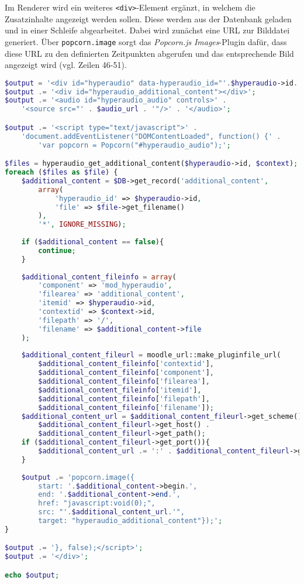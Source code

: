 Im Renderer wird ein weiteres \texttt{<div>}-Element ergänzt, in welchem die Zusatzinhalte angezeigt werden sollen. Diese werden aus der Datenbank geladen und in einer Schleife abgearbeitet. Dabei wird zunächst eine URL zur Bilddatei generiert. Über \texttt{popcorn.image} sorgt das \textit{Popcorn.js} \textit{Images}-Plugin dafür, dass diese URL zu den definierten Zeitpunkten abgerufen und das entsprechende Bild angezeigt wird (vgl. Zeilen 46-51).

\begin{lstlisting}[language=php,
             linewidth=\textwidth,
             caption={Ausschnitt der \textbf{renderer.php} in der 2. Iteration},
             label={lst:it2:renderer}]
$output = '<div id="hyperaudio" data-hyperaudio_id="'.$hyperaudio->id.'">';
$output .= '<div id="hyperaudio_additional_content"></div>';
$output .= '<audio id="hyperaudio_audio" controls>' .
    '<source src="' . $audio_url . '"/>' . '</audio>';

$output .= '<script type="text/javascript">' .
    'document.addEventListener("DOMContentLoaded", function() {' .
        'var popcorn = Popcorn("#hyperaudio_audio");';

$files = hyperaudio_get_additional_content($hyperaudio->id, $context);
foreach ($files as $file) {
    $additional_content = $DB->get_record('additional_content',
        array(
            'hyperaudio_id' => $hyperaudio->id,
            'file' => $file->get_filename()
	    ),
        '*', IGNORE_MISSING);
	
    if ($additional_content == false){
        continue;
	}
	
    $additional_content_fileinfo = array(
        'component' => 'mod_hyperaudio',
        'filearea' => 'additional_content',
        'itemid' => $hyperaudio->id,
        'contextid' => $context->id,
        'filepath' => '/',
        'filename' => $additional_content->file
    );
	
    $additional_content_fileurl = moodle_url::make_pluginfile_url(
        $additional_content_fileinfo['contextid'],
        $additional_content_fileinfo['component'],
        $additional_content_fileinfo['filearea'],
		$additional_content_fileinfo['itemid'],
		$additional_content_fileinfo['filepath'],
		$additional_content_fileinfo['filename']);
    $additional_content_url = $additional_content_fileurl->get_scheme() . '://' .
        $additional_content_fileurl->get_host() . 
        $additional_content_fileurl->get_path();
    if ($additional_content_fileurl->get_port()){
        $additional_content_url .= ':' . $additional_content_fileurl->get_port();
    }
	
    $output .= 'popcorn.image({
        start: '.$additional_content->begin.',
        end: '.$additional_content->end.',
        href: "javascript:void(0);",
        src: "'.$additional_content_url.'",
        target: "hyperaudio_additional_content"});';
}

$output .= '}, false);</script>';
$output .= '</div>';

echo $output;
\end{lstlisting}

